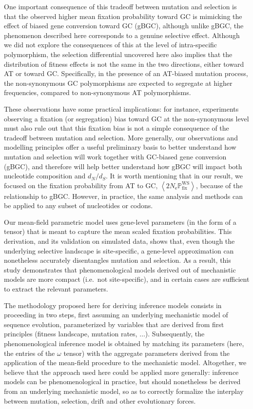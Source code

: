 \documentclass{article}
\newcommand{\Ne}{N_{\text{e}}}
\newcommand{\dn}{d_N}
\newcommand{\ds}{d_S}
\newcommand{\dnds}{\dn / \ds}
\newcommand{\proba}{\mathbb{P}}
\newcommand{\Pfix}{2 \Ne \proba_{\text{fix}}}
\newcommand{\avgpfixATtoGC}{\left\langle \Pfix^{\text{WS}} \right\rangle }
\begin{document}
One important consequence of this tradeoff between mutation and selection is that the observed higher mean fixation probability toward GC is mimicking the effect of biased gene conversion toward GC ({gBGC}), although unlike {gBGC}, the phenomenon described here corresponds to a genuine selective effect.
Although we did not explore the consequences of this at the level of intra-specific polymorphism, the selection differential uncovered here also implies that the distribution of fitness effects is not the same in the two directions, either toward AT or toward GC.
Specifically, in the presence of an AT-biased mutation process, the {non-synonymous} GC polymorphisms are expected to segregate at higher frequencies, compared to {non-synonymous} AT polymorphisms.

These observations have some practical implications: for instance, experiments observing a fixation (or segregation) bias toward GC at the {non-synonymous} level must also rule out that this fixation bias is not a simple consequence of the tradeoff between mutation and selection.
More generally, our observations and modelling principles offer a useful preliminary basis to better understand how mutation and selection will work together with GC-biased gene conversion ({gBGC}), and therefore will help better understand how {gBGC} will impact both nucleotide composition and $\dnds$.
It is worth mentioning that in our result, we focused on the fixation probability from AT to GC, $\avgpfixATtoGC$, because of the relationship to {gBGC}.
However, in practice, the same analysis and methods can be applied to any subset of nucleotides or codons.

Our mean-field parametric model uses gene-level parameters (in the form of a tensor) that is meant to capture the mean scaled fixation probabilities.
This derivation, and its validation on simulated data, shows that, even though the underlying selective landscape is site-specific, a gene-level approximation can nonetheless accurately disentangles mutation and selection.
As a result, this study demonstrates that phenomenological models derived out of mechanistic models are more compact (i.e.~not site-specific), and in certain cases are sufficient to extract the relevant parameters.

The methodology proposed here for deriving inference models consists in proceeding in two steps, first assuming an underlying mechanistic model of sequence evolution, parameterized by variables that are derived from first principles (fitness landscape, mutation rates, $\hdots$).
Subsequently, the phenomenological inference model is obtained by matching its parameters (here, the entries of the $\omega$ tensor) with the aggregate parameters derived from the application of the mean-field procedure to the mechanistic model.
Altogether, we believe that the approach used here could be applied more generally: inference models can be phenomenological in practice, but should nonetheless be derived from an underlying mechanistic model, so as to correctly formalize the interplay between mutation, selection, drift and other evolutionary forces.
\end{document}
